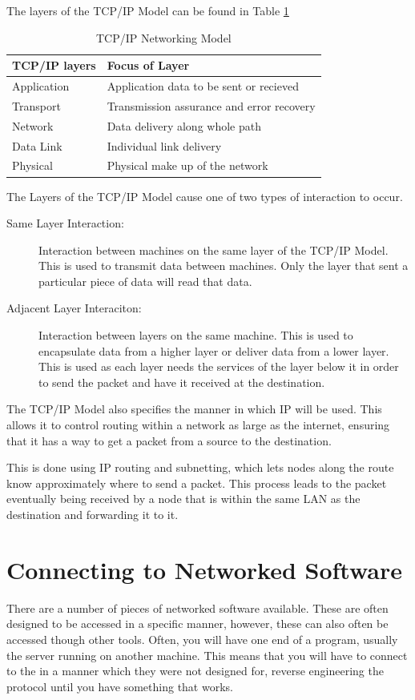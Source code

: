 \documentclass[a4paper,11pt]{report}
\begin{document}
		The layers of the TCP/IP Model can be found in Table \ref{tab:TCPIPModel}
		\begin{table}[htb]
			\centering
			\begin{tabular}{| l | l |}
				\hline
				\textbf{TCP/IP layers} & \textbf{Focus of Layer}\\ \hline
				Application & Application data to be sent or recieved\\ \hline
				Transport & Transmission assurance and error recovery\\ \hline
				Network & Data delivery along whole path\\ \hline
				Data Link & Individual link delivery\\ \hline
				Physical & Physical make up of the network\\ \hline
			\end{tabular}
			\caption{TCP/IP Networking Model}
			\label{tab:TCPIPModel}
		\end{table}

		The Layers of the TCP/IP Model cause one of two types of interaction to occur. 
		\begin{description}
			\item[Same Layer Interaction:] Interaction between machines on the same layer of the TCP/IP Model. 
				This is used to transmit data between machines. 
				Only the layer that sent a particular piece of data will read that data. 
			\item[Adjacent Layer Interaciton:] Interaction between layers on the same machine. 
				This is used to encapsulate data from a higher layer or deliver data from a lower layer. 
				This is used as each layer needs the services of the layer below it in order to send the packet and have it received at the destination. 
		\end{description}

		The TCP/IP Model also specifies the manner in which IP will be used. 
		This allows it to control routing within a network as large as the internet, 
		ensuring that it has a way to get a packet from a source to the destination. 

		This is done using IP routing and subnetting, which lets nodes along the route know approximately where to send a packet. 
		This process leads to the packet eventually being received by a node that is within the same LAN as the destination and forwarding it to it. 

	
	\section{Connecting to Networked Software}
		There are a number of pieces of networked software available. 
		These are often designed to be accessed in a specific manner, however, these can also often be accessed though other tools. 
		Often, you will have one end of a program, usually the server running on another machine. 
		This means that you will have to connect to the in a manner which they were not designed for, 
		reverse engineering the protocol until you have something that works. 
\end{document}
